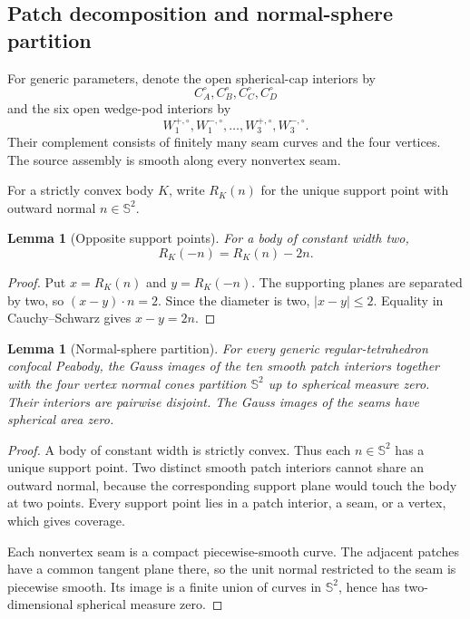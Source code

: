 \documentclass[11pt]{article}
\numberwithin{equation}{section}
\newtheorem{lemma}[theorem]{Lemma}
\theoremstyle{remark}
\newcommand{\Sph}{\mathbb{S}^{2}}
\begin{document}
\subsection{Patch decomposition and normal-sphere partition}

For generic parameters, denote the open spherical-cap interiors by
\[
  C_A^\circ,C_B^\circ,C_C^\circ,C_D^\circ
\]
and the six open wedge-pod interiors by
\[
  W_1^{+,\circ},W_1^{-,\circ},\ldots,W_3^{+,\circ},W_3^{-,\circ}.
\]
Their complement consists of finitely many seam curves and the four vertices.  The source assembly is smooth along every nonvertex seam.

For a strictly convex body \(K\), write \(R_K(n)\) for the unique support point with outward normal \(n\in\Sph\).

\begin{lemma}[Opposite support points]
\label{lem:opposite}
For a body of constant width two,
\begin{equation}
  R_K(-n)=R_K(n)-2n.
  \label{eq:opposite-support}
\end{equation}
\end{lemma}

\begin{proof}
Put \(x=R_K(n)\) and \(y=R_K(-n)\).  The supporting planes are separated by two, so \((x-y)\cdot n=2\).  Since the diameter is two, \(|x-y|\le2\).  Equality in Cauchy--Schwarz gives \(x-y=2n\).
\end{proof}

\begin{lemma}[Normal-sphere partition]
\label{lem:normal-partition}
For every generic regular-tetrahedron confocal Peabody, the Gauss images of the ten smooth patch interiors together with the four vertex normal cones partition \(\Sph\) up to spherical measure zero.  Their interiors are pairwise disjoint.  The Gauss images of the seams have spherical area zero.
\end{lemma}

\begin{proof}
A body of constant width is strictly convex.  Thus each \(n\in\Sph\) has a unique support point.  Two distinct smooth patch interiors cannot share an outward normal, because the corresponding support plane would touch the body at two points.  Every support point lies in a patch interior, a seam, or a vertex, which gives coverage.

Each nonvertex seam is a compact piecewise-smooth curve.  The adjacent patches have a common tangent plane there, so the unit normal restricted to the seam is piecewise smooth.  Its image is a finite union of curves in \(\Sph\), hence has two-dimensional spherical measure zero.
\end{proof}
\end{document}
